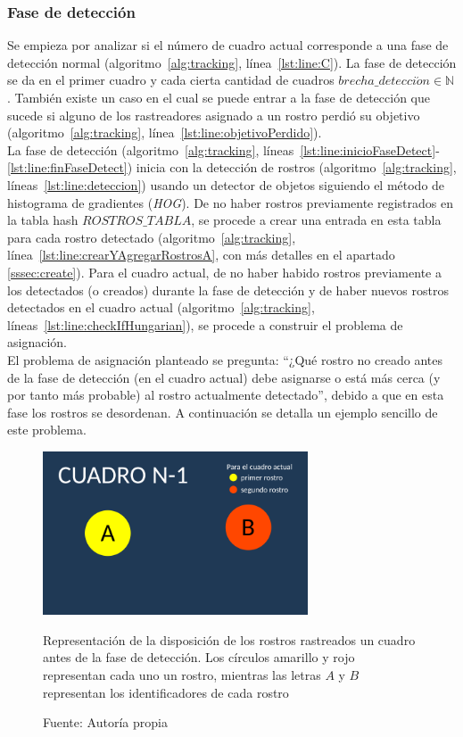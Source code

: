 \documentclass[a4paper,openright,12pt]{report}
\begin{document}
\subsubsection{Fase de detección}
Se empieza por analizar si el número de cuadro actual corresponde a una fase de
detección normal (algoritmo~\ref{alg:tracking}, línea~\ref{lst:line:C}).
La fase de detección se da en el primer cuadro
y cada cierta cantidad de cuadros $brecha\_detecci\acute on \in \mathbb{N}$.
También existe un caso en el cual se puede entrar a la fase de detección que
sucede si alguno de los rastreadores asignado a un rostro perdió su objetivo
(algoritmo~\ref{alg:tracking}, línea~\ref{lst:line:objetivoPerdido}).\\
La fase de detección
(algoritmo~\ref{alg:tracking}, líneas~\ref{lst:line:inicioFaseDetect}-\ref{lst:line:finFaseDetect})
inicia con la detección de rostros
(algoritmo~\ref{alg:tracking}, líneas~\ref{lst:line:deteccion}) usando un
detector de objetos siguiendo el método de histograma de gradientes
(\textit{HOG}). De no haber rostros previamente registrados en la tabla hash
$ROSTROS\_TABLA$, se procede a crear una entrada en esta tabla para cada
rostro detectado (algoritmo~\ref{alg:tracking},
línea~\ref{lst:line:crearYAgregarRostrosA}, con más detalles en el apartado
\ref{sssec:create}). Para el cuadro actual, de no haber habido rostros
previamente a los detectados (o creados) durante la fase de detección y de haber
nuevos rostros detectados en el cuadro actual (algoritmo~\ref{alg:tracking},
líneas~\ref{lst:line:checkIfHungarian}), se procede a construir el problema de
asignación.\\
El problema de asignación planteado se pregunta: ``¿Qué rostro
no creado antes de la fase de detección (en el cuadro actual) debe asignarse o
está más cerca (y por tanto más probable) al rostro actualmente detectado'',
debido a que en esta fase los rostros se desordenan. A continuación se detalla
un ejemplo sencillo de este problema.\\

\begin{figure}[!h]
  \centering
    \includegraphics[width=0.7\textwidth]{../images/hungarian-example-1.png}\par
  \caption{Representación de la disposición de los rostros rastreados un cuadro
           antes de la fase de detección. Los círculos amarillo y rojo
           representan cada uno un rostro, mientras las letras $A$ y $B$
           representan los identificadores de cada rostro}
    \label{fig:hungarian-example-1}
  \caption*{Fuente: Autoría propia}
\end{figure}
\end{document}
